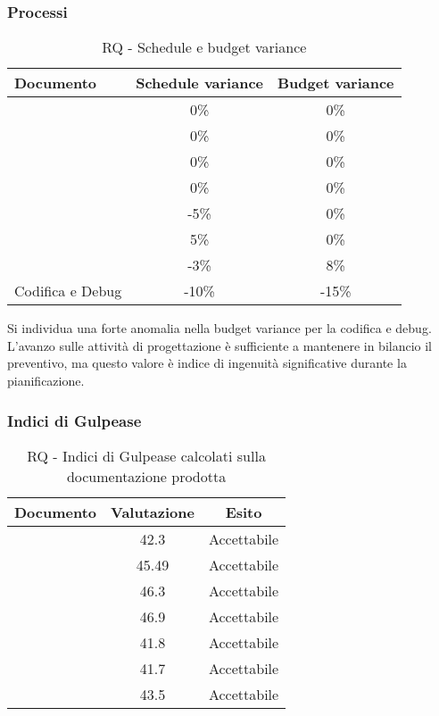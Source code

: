 \documentclass[../PianoDiQualifica.tex]{subfiles}
\begin{document}
				\subsubsection{Processi}
					\begin{table}[H]
					\center
						\begin{tabular}{|l|c|c|}
							\hline
							\rowcolor{blue!30}\textbf{Documento} & \textbf{Schedule variance} & \textbf{Budget variance} \\ \hline
							\analisideirequisitiRQ & 0\% & 0\% \\ \hline
							\glossarioRQ & 0\% & 0\% \\ \hline
							\normediprogettoRQ & 0\% & 0\% \\ \hline
							\pianodiprogettoRQ & 0\% & 0\% \\ \hline
							\pianodiqualificaRQ & -5\% & 0\% \\ \hline
							\specificatecnicaRQ & 5\% & 0\% \\ \hline
							 & -3\% & 8\% \\ \hline
							Codifica e Debug & -10\% & -15\% \\ \hline
						\end{tabular}
					\caption{RQ - Schedule e budget variance}
					\end{table}
					Si individua una forte anomalia nella budget variance per la codifica e debug. L'avanzo sulle attività di progettazione è sufficiente a mantenere in bilancio il preventivo, ma questo valore è indice di ingenuità significative durante la pianificazione.
				\subsubsection{Indici di Gulpease}
					\begin{table}[H]
					\center
						\begin{tabular}{|l|c|c|}
							\hline
							\rowcolor{blue!30}\textbf{Documento} & \textbf{Valutazione} & \textbf{Esito} \\ \hline
							\analisideirequisitiRQ & 42.3 & Accettabile \\ \hline
							\glossarioRQ & 45.49 &Accettabile  \\ \hline
							\normediprogettoRQ & 46.3 & Accettabile \\ \hline
							\pianodiprogettoRQ & 46.9 & Accettabile \\ \hline
							\pianodiqualificaRQ & 41.8 & Accettabile \\ \hline
							\specificatecnicaRQ & 41.7 & Accettabile \\ \hline
							 & 43.5 & Accettabile \\ \hline
						\end{tabular}
					\caption{RQ - Indici di Gulpease calcolati sulla documentazione prodotta}
					\end{table}
\end{document}
